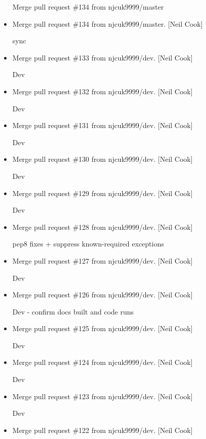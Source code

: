 \documentclass[a4paper,10pt,english]{report}
\begin{document}
\begin{itemize}
Merge pull request \#134 from njcuk9999/master

\item {} 
Merge pull request \#134 from njcuk9999/master. {[}Neil Cook{]}

sync

\item {} 
Merge pull request \#133 from njcuk9999/dev. {[}Neil Cook{]}

Dev

\item {} 
Merge pull request \#132 from njcuk9999/dev. {[}Neil Cook{]}

Dev

\item {} 
Merge pull request \#131 from njcuk9999/dev. {[}Neil Cook{]}

Dev

\item {} 
Merge pull request \#130 from njcuk9999/dev. {[}Neil Cook{]}

Dev

\item {} 
Merge pull request \#129 from njcuk9999/dev. {[}Neil Cook{]}

Dev

\item {} 
Merge pull request \#128 from njcuk9999/dev. {[}Neil Cook{]}

pep8 fixes + suppress known-required exceptions

\item {} 
Merge pull request \#127 from njcuk9999/dev. {[}Neil Cook{]}

Dev

\item {} 
Merge pull request \#126 from njcuk9999/dev. {[}Neil Cook{]}

Dev - confirm docs built and code runs

\item {} 
Merge pull request \#125 from njcuk9999/dev. {[}Neil Cook{]}

Dev

\item {} 
Merge pull request \#124 from njcuk9999/dev. {[}Neil Cook{]}

Dev

\item {} 
Merge pull request \#123 from njcuk9999/dev. {[}Neil Cook{]}

Dev

\item {} 
Merge pull request \#122 from njcuk9999/dev. {[}Neil Cook{]}


\end{itemize}
\end{document}
